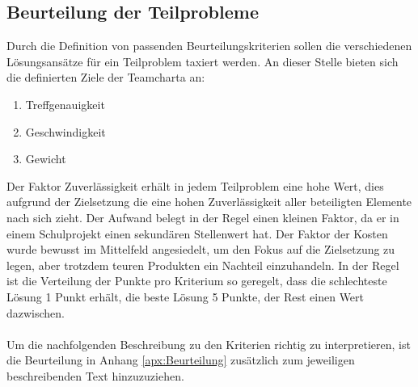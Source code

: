 	\subsection{Beurteilung der Teilprobleme}
		Durch die Definition von passenden Beurteilungskriterien sollen die verschiedenen Lösungsansätze für ein Teilproblem taxiert werden. An dieser Stelle bieten sich die definierten Ziele der Teamcharta an:
		
		\begin{enumerate}
			\item Treffgenauigkeit
			\item Geschwindigkeit
			\item Gewicht
		\end{enumerate}
		Der Faktor Zuverlässigkeit erhält in jedem Teilproblem eine hohe Wert, dies aufgrund der Zielsetzung die eine hohen Zuverlässigkeit aller beteiligten Elemente nach sich zieht. Der Aufwand belegt in der Regel einen kleinen Faktor, da er in einem Schulprojekt einen sekundären Stellenwert hat. Der Faktor der Kosten wurde bewusst im Mittelfeld angesiedelt, um den Fokus auf die Zielsetzung zu legen, aber trotzdem teuren Produkten ein Nachteil einzuhandeln.
		In der Regel ist die Verteilung der Punkte pro Kriterium so geregelt, dass die schlechteste Lösung 1 Punkt erhält, die beste Lösung 5 Punkte, der Rest einen Wert dazwischen.\\
		\\
		Um die nachfolgenden Beschreibung zu den Kriterien richtig zu interpretieren, ist die Beurteilung in Anhang \ref{apx:Beurteilung} zusätzlich zum jeweiligen beschreibenden Text hinzuzuziehen. 
